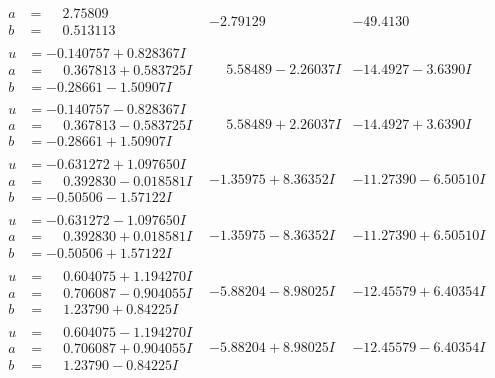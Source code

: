 \documentclass[1p]{elsarticle_modified}
\theoremstyle{definition}
\begin{document}
$$\begin{array}{c|c|c}
\begin{aligned}
a &= \phantom{-}2.75809\phantom{ +0.000000I} \\
b &= \phantom{-}0.513113\phantom{ +0.000000I}\end{aligned}
 & -2.79129\phantom{ +0.000000I} & -49.4130\phantom{ +0.000000I} \\ \hline\begin{aligned}
u &= -0.140757 + 0.828367 I \\
a &= \phantom{-}0.367813 + 0.583725 I \\
b &= -0.28661 - 1.50907 I\end{aligned}
 & \phantom{-}5.58489 - 2.26037 I & -14.4927 - 3.6390 I \\ \hline\begin{aligned}
u &= -0.140757 - 0.828367 I \\
a &= \phantom{-}0.367813 - 0.583725 I \\
b &= -0.28661 + 1.50907 I\end{aligned}
 & \phantom{-}5.58489 + 2.26037 I & -14.4927 + 3.6390 I \\ \hline\begin{aligned}
u &= -0.631272 + 1.097650 I \\
a &= \phantom{-}0.392830 - 0.018581 I \\
b &= -0.50506 - 1.57122 I\end{aligned}
 & -1.35975 + 8.36352 I & -11.27390 - 6.50510 I \\ \hline\begin{aligned}
u &= -0.631272 - 1.097650 I \\
a &= \phantom{-}0.392830 + 0.018581 I \\
b &= -0.50506 + 1.57122 I\end{aligned}
 & -1.35975 - 8.36352 I & -11.27390 + 6.50510 I \\ \hline\begin{aligned}
u &= \phantom{-}0.604075 + 1.194270 I \\
a &= \phantom{-}0.706087 - 0.904055 I \\
b &= \phantom{-}1.23790 + 0.84225 I\end{aligned}
 & -5.88204 - 8.98025 I & -12.45579 + 6.40354 I \\ \hline\begin{aligned}
u &= \phantom{-}0.604075 - 1.194270 I \\
a &= \phantom{-}0.706087 + 0.904055 I \\
b &= \phantom{-}1.23790 - 0.84225 I\end{aligned}
 & -5.88204 + 8.98025 I & -12.45579 - 6.40354 I \\ \hline\begin{aligned}

\end{aligned}
\end{array}$$
\end{document}
